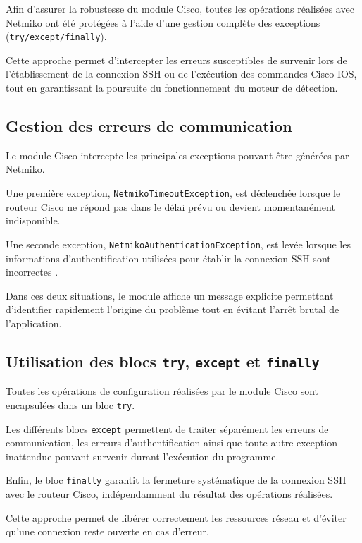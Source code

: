 Afin d'assurer la robustesse du module Cisco, toutes les opérations réalisées avec Netmiko ont été protégées à l'aide d'une gestion complète des exceptions (\texttt{try/except/finally}).

Cette approche permet d'intercepter les erreurs susceptibles de survenir lors de l'établissement de la connexion SSH ou de l'exécution des commandes Cisco IOS, tout en garantissant la poursuite du fonctionnement du moteur de détection.

\subsection{Gestion des erreurs de communication}

Le module Cisco intercepte les principales exceptions pouvant être générées par Netmiko.

Une première exception, \texttt{NetmikoTimeoutException}, est déclenchée lorsque le routeur Cisco ne répond pas dans le délai prévu ou devient momentanément indisponible.

Une seconde exception, \texttt{NetmikoAuthenticationException}, est levée lorsque les informations d'authentification utilisées pour établir la connexion SSH sont incorrectes \cite{netmiko_docs}.

Dans ces deux situations, le module affiche un message explicite permettant d'identifier rapidement l'origine du problème tout en évitant l'arrêt brutal de l'application.

\subsection{Utilisation des blocs \texttt{try}, \texttt{except} et \texttt{finally}}

Toutes les opérations de configuration réalisées par le module Cisco sont encapsulées dans un bloc \texttt{try}.

Les différents blocs \texttt{except} permettent de traiter séparément les erreurs de communication, les erreurs d'authentification ainsi que toute autre exception inattendue pouvant survenir durant l'exécution du programme.

Enfin, le bloc \texttt{finally} garantit la fermeture systématique de la connexion SSH avec le routeur Cisco, indépendamment du résultat des opérations réalisées.

Cette approche permet de libérer correctement les ressources réseau et d'éviter qu'une connexion reste ouverte en cas d'erreur.

